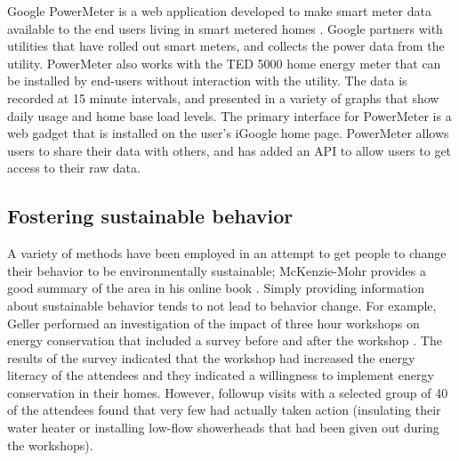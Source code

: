 
Google PowerMeter is a web application developed to make smart meter data available to the end users living in smart metered homes \cite{Google-PowerMeter}. Google partners with utilities that have rolled out smart meters, and collects the power data from the utility. PowerMeter also works with the TED 5000 home energy meter that can be installed by end-users without interaction with the utility. The data is recorded at 15 minute intervals, and presented in a variety of graphs that show daily usage and home base load levels. The primary interface for PowerMeter is a web gadget that is installed on the user's iGoogle home page. PowerMeter allows users to share their data with others, and has added an API to allow users to get access to their raw data.

\subsection{Fostering sustainable behavior}

A variety of methods have been employed in an attempt to get people to change their behavior to be environmentally sustainable; McKenzie-Mohr provides a good summary of the area in his online book \cite{McKenzie-Mohr2009}. Simply providing information about sustainable behavior tends to not lead to behavior change. For example, Geller performed an investigation of the impact of three hour workshops on energy conservation that included a survey before and after the workshop \cite{Geller81}. The results of the survey indicated that the workshop had increased the energy literacy of the attendees and they indicated a willingness to implement energy conservation in their homes. However, followup visits with a selected group of 40 of the attendees found that very few had actually taken action (insulating their water heater or installing low-flow showerheads that had been given out during the workshops).


